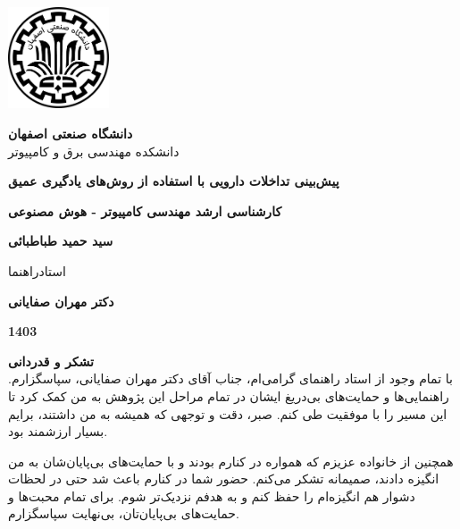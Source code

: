 \thispagestyle{empty}
\begin{center}
\includegraphics[height=3cm]{iut_logo.png}
\vspace{0.4cm}

{\large
	\textbf{دانشگاه صنعتی اصفهان}\\
	دانشکده مهندسی برق و کامپیوتر
}
\vspace{3.5cm}

{\LARGE
	\textbf{پیش‌بینی تداخلات دارویی با استفاده از روش‌های یادگیری عمیق}\\
}
\vspace{3.5cm}

{\large
	\textbf{کارشناسی ارشد مهندسی کامپیوتر - هوش مصنوعی}\\
}
\vspace{1cm}

{\Large
	\textbf{سید حمید طباطبائی}\\
}
\vspace{2.5cm}

{\large
	استادراهنما\\
}
\vspace{0.5cm}

{\Large
	\textbf{دکتر مهران صفایانی}\\
}
\vspace{3.5cm}

{\Large
	\textbf{1403}
}

\end{center}
\restoregeometry
\pagebreak

\thispagestyle{empty}
\vspace*{1.5cm}

{\large
	\textbf{تشکر و قدردانی}\\
	
	
	با تمام وجود از استاد راهنمای گرامی‌ام، جناب آقای دکتر مهران صفایانی، سپاسگزارم. راهنمایی‌ها و حمایت‌های بی‌دریغ ایشان در تمام مراحل این پژوهش به من کمک کرد تا این مسیر را با موفقیت طی کنم. صبر، دقت و توجهی که همیشه به من داشتند، برایم بسیار ارزشمند بود.
	
	همچنین از خانواده عزیزم که همواره در کنارم بودند و با حمایت‌های بی‌پایان‌شان به من انگیزه دادند، صمیمانه تشکر می‌کنم. حضور شما در کنارم باعث شد حتی در لحظات دشوار هم انگیزه‌ام را حفظ کنم و به هدفم نزدیک‌تر شوم. برای تمام محبت‌ها و حمایت‌های بی‌پایان‌تان، بی‌نهایت سپاسگزارم.
	
}
\restoregeometry
\pagebreak

